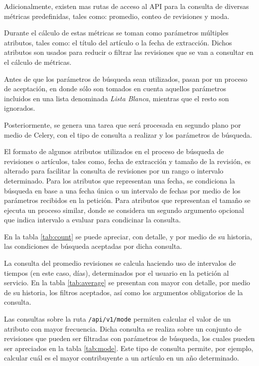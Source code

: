 Adicionalmente, existen mas rutas de acceso al API para la consulta de diversas métricas predefinidas, tales como: promedio, conteo de revisiones y moda.

Durante el cálculo de estas métricas se toman como parámetros múltiples atributos, tales como: el título del artículo o la fecha de extracción.
Dichos atributos son usados para reducir o filtrar las revisiones que se van a consultar en el cálculo de  métricas.

Antes de que los parámetros de búsqueda sean utilizados, pasan por un proceso de aceptación, en donde sólo son tomados en cuenta aquellos parámetros incluidos en una lista denominada \textit{Lista Blanca}, mientras que el resto son ignorados.

Posteriormente, se genera una tarea que será procesada en segundo plano por medio de Celery, con el tipo de consulta a realizar y los parámetros de búsqueda.

El formato de algunos atributos utilizados en el proceso de búsqueda de revisiones o artículos, tales como, fecha de extracción y tamaño de la revisión, es alterado para facilitar la consulta de revisiones por un rango o intervalo determinado.
Para los atributos que representan una fecha, se condiciona la búsqueda en base a una fecha única o un intervalo de fechas por medio de los parámetros recibidos en la petición.
Para atributos que representan el tamaño se ejecuta un proceso similar, donde se considera un segundo argumento opcional que indica intervalo a evaluar para condicinar la consulta.

En la tabla \ref{tab:count} se puede apreciar, con detalle, y por medio de su historia, las condiciones de búsqueda aceptadas por dicha consulta.



La consulta del promedio revisiones se calcula haciendo uso de intervalos de tiempos (en este caso, días), determinados por el usuario en la petición al servicio.
En la tabla \ref{tab:average} se presentan con mayor con detalle, por medio de su historia, los filtros aceptados, así como los argumentos obligatorios de la consulta.



Las consultas sobre la ruta \texttt{/api/v1/mode} permiten calcular el valor de un atributo con mayor frecuencia.
Dicha consulta se realiza sobre un conjunto de revisiones que pueden ser filtradas con parámetros de búsqueda, los cuales pueden ser apreciados en la tabla \ref{tab:mode}.
Este tipo de consulta permite, por ejemplo, calcular cuál es el mayor contribuyente a un artículo en un año determinado.

